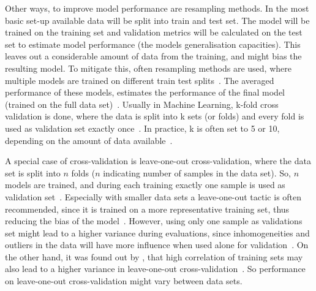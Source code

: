 
Other ways, to improve model performance are resampling methods.
In the most basic set-up available data will be split into train and test set.
The model will be trained on the training set and validation metrics will be calculated on the test set to estimate model performance (the models generalisation capacities).
This leaves out a considerable amount of data from the training, and might bias the resulting model.
To mitigate this, often resampling methods are used, where multiple models are trained on different train test splits~\autocite[Chapter 5]{James2013}.
The averaged performance of these models, estimates the performance of the final model (trained on the full data set)~\autocite[Chapter 5]{James2013}.
 Usually in Machine Learning, k-fold cross validation is done, where the data is split into k sets (or folds) and every fold is used as validation set exactly once~\autocite[Chapter 5]{James2013}.
In practice, k is often set to 5 or 10, depending on the amount of data available~\autocite[Chapter 5]{James2013}.

A special case of cross-validation is leave-one-out cross-validation, where the data set is split into $n$ folds ($n$ indicating number of samples in the data set).
So, $n$ models are trained, and during each training exactly one sample is used as validation set~\autocite[Chapter 5]{James2013}.
Especially with smaller data sets a leave-one-out tactic is often recommended, since it is trained on a more representative training set, thus reducing the bias of the model~\autocite[Chapter 5]{James2013}. %
However, using only one sample as validations set might lead to a higher variance during evaluations, since inhomogeneities and outliers in the data will have more influence when used alone for validation~\autocite[Chapter 5]{James2013}.
On the other hand, it was found out by \citeauthor{Bengio2004}, that high correlation of training sets may also lead to a higher variance in leave-one-out cross-validation~\autocite{Bengio2004}. %
So performance on leave-one-out cross-validation might vary between data sets.

